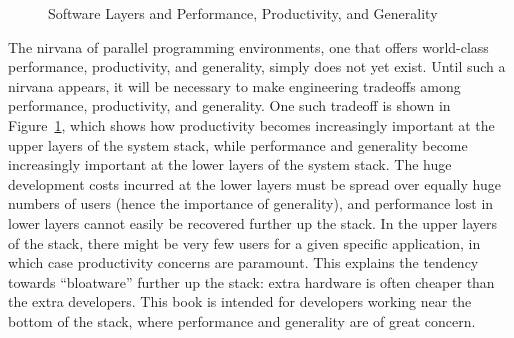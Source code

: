 \begin{figure}[tb]
\begin{center}
\end{center}
\caption{Software Layers and Performance, Productivity, and Generality}
\label{fig:intro:Software Layers and Performance, Productivity, and Generality}
\end{figure}

The nirvana of parallel programming environments, one that offers
world-class performance, productivity, and generality, simply does
not yet exist.
Until such a nirvana appears, it will be necessary to make engineering
tradeoffs among performance, productivity, and generality.
One such tradeoff is shown in
Figure~\ref{fig:intro:Software Layers and Performance, Productivity, and Generality},
which shows how productivity becomes increasingly important at the upper layers
of the system stack,
while performance and generality become increasingly important at the
lower layers of the system stack.
The huge development costs incurred at the lower layers
must be spread over equally huge numbers of users
(hence the importance of generality), and
performance lost in lower layers cannot easily be
recovered further up the stack.
In the upper layers of the stack, there might be very few users for a given
specific application, in which case productivity concerns are paramount.
This explains the tendency towards ``bloatware'' further up the stack:
extra hardware is often cheaper than the extra developers.
This book is intended for developers working near the bottom
of the stack, where performance and generality are of great concern.

